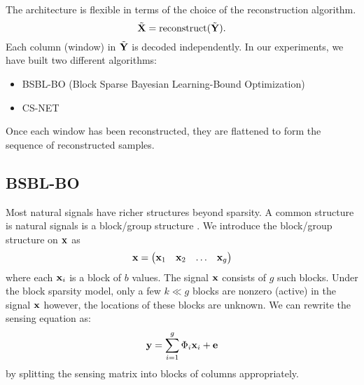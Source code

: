 The architecture is flexible in terms of the choice of the
reconstruction algorithm.
\begin{equation}
\tilde{\mathbf{X}} = \mathrm{reconstruct}(\tilde{\mathbf{Y}}).
\end{equation}
Each column (window) in $\tilde{\mathbf{Y}}$ is decoded independently.
In our experiments, we have built two different algorithms:
\begin{itemize}
  \item BSBL-BO (Block Sparse Bayesian Learning-Bound Optimization)
  \cite{zhang2013extension,zhang2012compressed,zhang2016comparison}
  \item CS-NET \cite{zhang2021csnet}
\end{itemize}
Once each window has been reconstructed, they are flattened
to form the sequence of reconstructed samples.

\subsection{BSBL-BO}
Most natural signals have richer structures beyond
sparsity. A common structure is natural signals
is a block/group structure \cite{eldar2010block}. 
We introduce the block/group structure on $\mathbf{x}$ as
\begin{equation}
\mathbf{x} = \begin{pmatrix}
\mathbf{x}_1 & \mathbf{x}_2 & \dots & \mathbf{x}_g
\end{pmatrix}
\end{equation}
where each $\mathbf{x}_i$ is a block of $b$ values.
The signal $\mathbf{x}$ consists of $g$ such blocks.
Under the block sparsity model, only a few $k \ll g$
blocks are nonzero (active) in the signal $\mathbf{x}$
however, the locations of these blocks are unknown.
We can rewrite the sensing equation as:
\begin{equation}
\mathbf{y} = \sum_{i=1}^g \Phi_i \mathbf{x}_i + \mathbf{e}
\end{equation}
by splitting the sensing matrix into blocks of columns appropriately.

